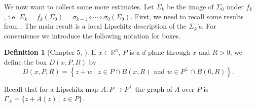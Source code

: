 \documentclass[11pt, twoside, leqno]{article}
\numberwithin{equation}{section}
\theoremstyle{plain}
\newtheorem{cor}[thm]{Corollary}
\theoremstyle{definition}
\newtheorem{defin}[thm]{Definition}
\newcommand{\R}{\mathbb{R}}
\newcommand{\e}{\varepsilon} %
\begin{document}
%
%

We now want to collect some more estimates. Let $\Sigma_k$ be the image of $\Sigma_0$ under $f_k$, i.e. $\Sigma_k=f_k(\Sigma_0)=\sigma_{k-1} \circ \cdots \circ \sigma_0 (\Sigma_0)$. First, we need to recall some results from   \cite{davidtoro}. 
The main result is a local Lipschitz description of the $\Sigma_k$'s. For convenience we introduce the following notation for boxes.
\begin{defin} [Chapter 5, \cite{davidtoro}]
If $x \in \R^n$, $P$ is a $d$-plane through $x$ and $R>0$, we define the box $D(x,P,R)$ by
\begin{equation}
D(x,P,R)= \left\{ z + w \mid z \in P \cap B(x,R) \text{ and } w \in P^{\perp} \cap B(0,R)\right\}.
\end{equation}
\end{defin}

Recall that for a Lipschitz map $A \colon P \to P^{\perp}$ the graph of $A$ over $P$ is $\Gamma_A=\{z + A(z) \mid z \in P\}$.
\end{document}
